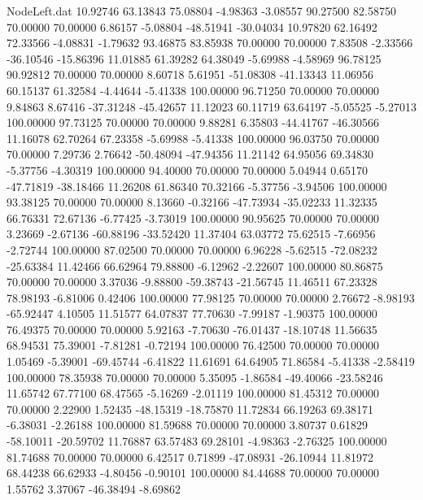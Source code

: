 \begin{filecontents}{NodeLeft.dat}
  10.92746   63.13843   75.08804    -4.98363   -3.08557   90.27500   82.58750   70.00000   70.00000    6.86157   -5.08804  -48.51941  -30.04034
  10.97820   62.16492   72.33566    -4.08831   -1.79632   93.46875   83.85938   70.00000   70.00000    7.83508   -2.33566  -36.10546  -15.86396
  11.01885   61.39282   64.38049    -5.69988   -4.58969   96.78125   90.92812   70.00000   70.00000    8.60718    5.61951  -51.08308  -41.13343
  11.06956   60.15137   61.32584    -4.44644   -5.41338  100.00000   96.71250   70.00000   70.00000    9.84863    8.67416  -37.31248  -45.42657
  11.12023   60.11719   63.64197    -5.05525   -5.27013  100.00000   97.73125   70.00000   70.00000    9.88281    6.35803  -44.41767  -46.30566
  11.16078   62.70264   67.23358    -5.69988   -5.41338  100.00000   96.03750   70.00000   70.00000    7.29736    2.76642  -50.48094  -47.94356
  11.21142   64.95056   69.34830    -5.37756   -4.30319  100.00000   94.40000   70.00000   70.00000    5.04944    0.65170  -47.71819  -38.18466
  11.26208   61.86340   70.32166    -5.37756   -3.94506  100.00000   93.38125   70.00000   70.00000    8.13660   -0.32166  -47.73934  -35.02233
  11.32335   66.76331   72.67136    -6.77425   -3.73019  100.00000   90.95625   70.00000   70.00000    3.23669   -2.67136  -60.88196  -33.52420
  11.37404   63.03772   75.62515    -7.66956   -2.72744  100.00000   87.02500   70.00000   70.00000    6.96228   -5.62515  -72.08232  -25.63384
  11.42466   66.62964   79.88800    -6.12962   -2.22607  100.00000   80.86875   70.00000   70.00000    3.37036   -9.88800  -59.38743  -21.56745
  11.46511   67.23328   78.98193    -6.81006    0.42406  100.00000   77.98125   70.00000   70.00000    2.76672   -8.98193  -65.92447    4.10505
  11.51577   64.07837   77.70630    -7.99187   -1.90375  100.00000   76.49375   70.00000   70.00000    5.92163   -7.70630  -76.01437  -18.10748
  11.56635   68.94531   75.39001    -7.81281   -0.72194  100.00000   76.42500   70.00000   70.00000    1.05469   -5.39001  -69.45744   -6.41822
  11.61691   64.64905   71.86584    -5.41338   -2.58419  100.00000   78.35938   70.00000   70.00000    5.35095   -1.86584  -49.40066  -23.58246
  11.65742   67.77100   68.47565    -5.16269   -2.01119  100.00000   81.45312   70.00000   70.00000    2.22900    1.52435  -48.15319  -18.75870
  11.72834   66.19263   69.38171    -6.38031   -2.26188  100.00000   81.59688   70.00000   70.00000    3.80737    0.61829  -58.10011  -20.59702
  11.76887   63.57483   69.28101    -4.98363   -2.76325  100.00000   81.74688   70.00000   70.00000    6.42517    0.71899  -47.08931  -26.10944
  11.81972   68.44238   66.62933    -4.80456   -0.90101  100.00000   84.44688   70.00000   70.00000    1.55762    3.37067  -46.38494   -8.69862

\end{filecontents}
